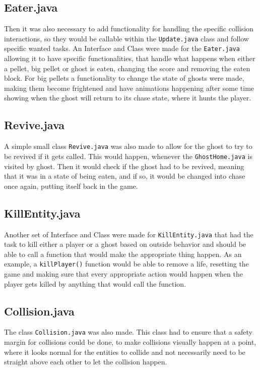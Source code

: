 \documentclass[a4paper,5pt]{article}
\begin{document}
\subsection{Eater.java}
Then it was also necessary to add functionality for handling the specific collision interactions, so they would be callable within the \texttt{Update.java} class and follow specific wanted tasks. An Interface and Class were made for the \texttt{Eater.java} allowing it to have specific functionalities, that handle what happens when either a pellet, big pellet or ghost is eaten, changing the score and removing the eaten block. For big pellets a functionality to change the state of ghosts were made, making them become frightened and have animations happening after some time showing when the ghost will return to its chase state, where it hunts the player.

\subsection{Revive.java}
A simple small class \texttt{Revive.java} was also made to allow for the ghost to try to be revived if it gets called. This would happen, whenever the \texttt{GhostHome.java} is visited by ghost. Then it would check if the ghost had to be revived, meaning that it was in a state of being eaten, and if so, it would be changed into chase once again, putting itself back in the game.

\subsection{KillEntity.java}
Another set of Interface and Class were made for \texttt{KillEntity.java} that had the task to kill either a player or a ghost based on outside behavior and should be able to call a function that would make the appropriate thing happen. As an example, a \texttt{killPlayer()} function would be able to remove a life, resetting the game and making sure that every appropriate action would happen when the player gets killed by anything that would call the function.

\subsection{Collision.java}
The class \texttt{Collision.java} was also made. This class had to ensure that a safety margin for collisions could be done, to make collisions visually happen at a point, where it looks normal for the entities to collide and not necessarily need to be straight above each other to let the collision happen.
\end{document}

